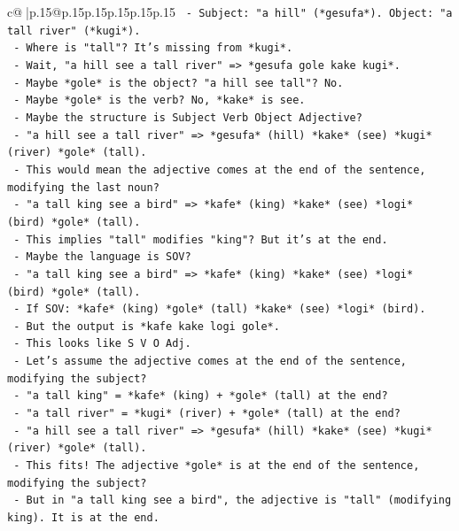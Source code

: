 \documentclass{article}
\begin{document}
{\begin{supertabular}{c@{$\;$}|p{.15\linewidth}@{}p{.15\linewidth}p{.15\linewidth}p{.15\linewidth}p{.15\linewidth}p{.15\linewidth}}
{{{\texttt{          {-} Subject: "a hill" (*gesufa*). Object: "a tall river" (*kugi*).} \\
\texttt{          {-} Where is "tall"? It's missing from *kugi*.} \\
\texttt{          {-} Wait, "a hill see a tall river" => *gesufa gole kake kugi*.} \\
\texttt{          {-} Maybe *gole* is the object? "a hill see tall"? No.} \\
\texttt{          {-} Maybe *gole* is the verb? No, *kake* is see.} \\
\texttt{          {-} Maybe the structure is Subject Verb Object Adjective?} \\
\texttt{          {-} "a hill see a tall river" => *gesufa* (hill) *kake* (see) *kugi* (river) *gole* (tall).} \\
\texttt{          {-} This would mean the adjective comes at the end of the sentence, modifying the last noun?} \\
\texttt{          {-} "a tall king see a bird" => *kafe* (king) *kake* (see) *logi* (bird) *gole* (tall).} \\
\texttt{          {-} This implies "tall" modifies "king"? But it's at the end.} \\
\texttt{          {-} Maybe the language is SOV?} \\
\texttt{          {-} "a tall king see a bird" => *kafe* (king) *kake* (see) *logi* (bird) *gole* (tall).} \\
\texttt{          {-} If SOV: *kafe* (king) *gole* (tall) *kake* (see) *logi* (bird).} \\
\texttt{          {-} But the output is *kafe kake logi gole*.} \\
\texttt{          {-} This looks like S V O Adj.} \\
\texttt{          {-} Let's assume the adjective comes at the end of the sentence, modifying the subject?} \\
\texttt{          {-} "a tall king" = *kafe* (king) + *gole* (tall) at the end?} \\
\texttt{          {-} "a tall river" = *kugi* (river) + *gole* (tall) at the end?} \\
\texttt{          {-} "a hill see a tall river" => *gesufa* (hill) *kake* (see) *kugi* (river) *gole* (tall).} \\
\texttt{          {-} This fits! The adjective *gole* is at the end of the sentence, modifying the subject?} \\
\texttt{          {-} But in "a tall king see a bird", the adjective is "tall" (modifying king). It is at the end.} \\
}}}
\end{supertabular}}
\end{document}
